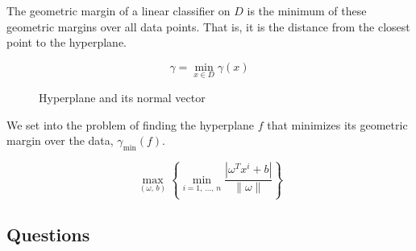 The geometric margin of a linear classifier on $D$ is the minimum of
these geometric margins over all data points. That is, it is the distance
from the closest point to the hyperplane.

\begin{equation*}
  \gamma = \min_{x \in D} \gamma(x) \tag{geometric margin of a linear classifier}
\end{equation*}

\begin{figure}[H]
	\caption{Hyperplane and its normal vector}
\end{figure}

We set into the problem of finding the hyperplane $f$ that minimizes
its geometric margin over the data, $\gamma_{\text{min}}(f)$.

\begin{equation*}
  \max_{(\omega,\, b)}
  \left\{
  \min_{i=1,\,\dots,\, n}
    \frac{| \omega^Tx^i + b |}{\lVert\omega\rVert}
  \right\}
\end{equation*}

\subsection*{Questions}

